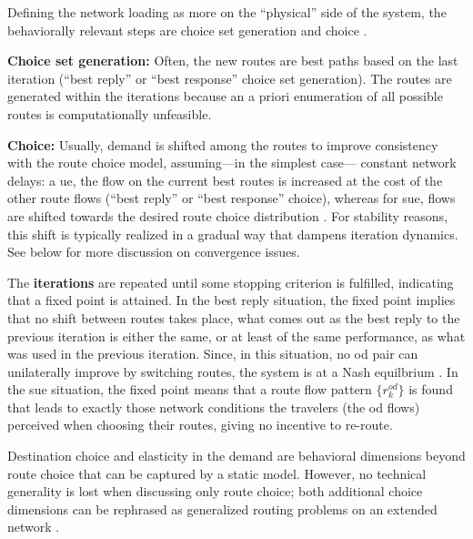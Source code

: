Defining the network loading as more on the ``physical'' side of the system, 
the behaviorally relevant steps are choice set generation and choice \citep{bowman-1998}.

\textbf{Choice set generation:} Often, the new routes are best paths
based on the last iteration (``best reply'' or ``best response'' choice set generation).
The routes are generated within the iterations because an a priori
enumeration of all possible routes is computationally unfeasible.

\textbf{Choice:} Usually, demand is shifted among the routes 
to improve consistency with the route choice model, assuming---in the simplest case---
constant network delays:  a \gls{ue}, the flow on the current
best routes is increased at the cost of the other route flows (``best reply'' or ``best response''
choice), whereas for  \gls{sue},  flows are shifted towards the
desired route choice distribution \citep[often a version of multinomial logit,
  e.g.,][]{dial-1971, cascetta-1996, ben-akiva-1999}. For
stability reasons, this shift is typically realized in a gradual
way that dampens  iteration dynamics. See below for more
discussion on convergence issues.

The \textbf{iterations} are repeated until some stopping criterion is
fulfilled, indicating that a fixed point is attained.
In the best reply situation, the fixed point implies that no shift
between routes takes place, \ie what comes out as the best reply to
the previous iteration is either the same, or at least of the same
performance, as what was used in the previous iteration.
Since, in this situation, no \gls{od} pair can unilaterally improve
by switching routes, the system is at a Nash
equilbrium \citep[e.g.,][]{HofbSigmBook}.
In the \gls{sue} situation, the fixed point means that a route flow pattern 
$\{r^{od}_k\}$ is found that leads to exactly those network conditions the
travelers (the \gls{od} flows) perceived when choosing their routes,
giving no incentive to re-route.


Destination choice and elasticity in the demand are behavioral dimensions
beyond route choice that can be captured by a
static model.
However, no technical generality is lost when discussing only
route choice; both additional choice dimensions can be
rephrased as generalized routing problems on an extended network
\citep[``supernetwork''; see, e.g.,][]{Sheffi_1985,NagurneyEtcSupernetworks}. 


